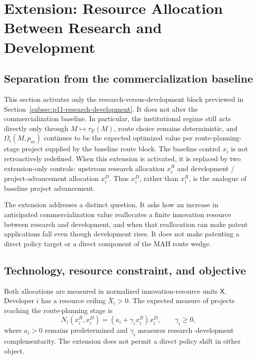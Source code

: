 \section{Extension: Resource Allocation Between Research and Development}
\label{sec:erd-extension}

\subsection{Separation from the commercialization baseline}
\label{subsec:erd-separation}

This section activates only the research-versus-development block previewed
in Section~\ref{subsec:p11-research-development}. It does not alter the
commercialization baseline. In particular, the institutional regime still
acts directly only through \(M\mapsto\tau_E(M)\), route choice remains
deterministic, and \(\Omega_i(M,p_m)\) continues to be the expected optimized
value per route-planning-stage project supplied by the baseline route block.
The baseline control \(x_i\) is not retroactively redefined. When this
extension is activated, it is replaced by two extension-only controls:
upstream research allocation \(x_i^R\) and development / project-advancement
allocation \(x_i^D\). Thus \(x_i^D\), rather than \(x_i^R\), is the analogue
of baseline project advancement.

The extension addresses a distinct question. It asks how an increase in
anticipated commercialization value reallocates a finite innovation resource
between research and development, and when that reallocation can make patent
applications fall even though development rises. It does not make patenting
a direct policy target or a direct component of the MAH route wedge.

\subsection{Technology, resource constraint, and objective}
\label{subsec:erd-problem}

Both allocations are measured in normalized innovation-resource units
\(\mathsf X\). Developer \(i\) has a resource ceiling
\(\bar X_i>0\). The expected measure of projects reaching the route-planning
stage is
\begin{equation}
  N_i(x_i^R,x_i^D)
  =
  \left(a_i+\gamma_i x_i^R\right)x_i^D,
  \qquad \gamma_i\geq0,
  \label{eq:erd-project-technology}
\end{equation}
where \(a_i>0\) remains predetermined and \(\gamma_i\) measures
research--development complementarity. The extension does not permit a
direct policy shift in either object.

